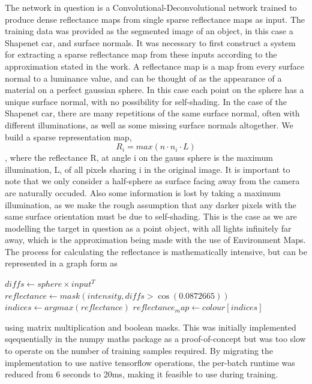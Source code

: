 \documentclass[ %
                    author={Gavin Parker},
                supervisor={Dr. Neill Campbell},
                    degree={MEng},
                     title={Deep Siamese Networks for Illumination Estimation from Stereo Images},
                  subtitle={},
                      type={research},
                      year={2018} ]{dissertation}
\begin{document}
The network in question is a Convolutional-Deconvolutional network trained to produce dense reflectance maps from single sparse reflectance maps as input. The training data was provided as the segmented image of an object, in this case a Shapenet car, and surface normals. It was necessary to first construct a system for extracting a sparse reflectance map from these inputs according to the approximation stated in the work. A reflectance map is a map from every surface normal to a luminance value, and can be thought of as the appearance of a material on a perfect gaussian sphere. In this case each point on the sphere has a unique surface normal, with no possibility for self-shading. In the case of the Shapenet car, there are many repetitions of the same surface normal, often with different illuminations, as well as some missing surface normals altogether. We build a sparse representation map,
\[ R_i = max(n\cdot n_i \cdot L)\],
where the reflectance R, at angle i on the gauss sphere is the maximum illumination, L, of all pixels sharing i in the original image. It is important to note that we only consider a half-sphere as surface facing away from the camera are naturally occuded. Also some information is lost by taking a maximum illumination, as we make the rough assumption that any darker pixels with the same surface orientation must be due to self-shading. This is the case as we are modelling the target in question as a point object, with all lights infinitely far away, which is the approximation being made with the use of Environment Maps.
\newline
The process for calculating the reflectance is mathematically intensive, but can be represented in a graph form as
\begin{algorithm}
$ diffs \leftarrow sphere \times input^T $\;
$ reflectance \leftarrow mask(intensity, diffs > \cos(0.0872665)) $\;
$ indices \leftarrow argmax(reflectance) $\;
$ reflectance_map \leftarrow colour[indices] $\;
\end{algorithm}
using matrix multiplication and boolean masks. This was initially implemented sqequentially in the numpy maths package as a proof-of-concept but was too slow to operate on the number of training samples required. By migrating the implementation to use native tensorflow operations, the per-batch runtime was reduced from 6 seconds to 20ms, making it feasible to use during training.
\newline
\end{document}
